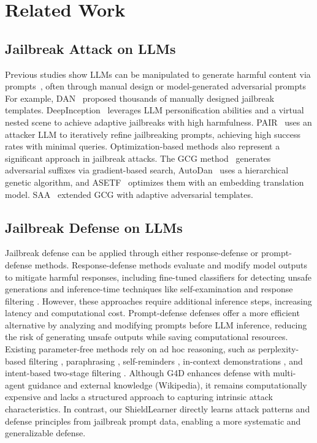 \section{Related Work}
\label{Related Work}
\subsection{Jailbreak Attack on LLMs}
Previous studies show LLMs can be manipulated to generate harmful content via prompts~\citep{wang2024diffusionattacker, wei2024jailbroken}, often through manual design or model-generated adversarial prompts
For example, DAN~\cite{shen2024anything} proposed thousands of manually designed jailbreak templates. DeepInception~\cite{li2023deepinception} leverages LLM personification abilities and a virtual nested scene to achieve adaptive jailbreaks with high harmfulness. PAIR~\cite{chao2023jailbreaking} uses an attacker LLM to iteratively refine jailbreaking prompts, achieving high success rates with minimal queries.
Optimization-based methods also represent a significant approach in jailbreak attacks. 
The GCG method~\cite{zou2023universal} generates adversarial suffixes via gradient-based search, AutoDan~\cite{liu2023autodan} uses a hierarchical genetic algorithm, and ASETF~\cite{wang2024asetf} optimizes them with an embedding translation model.
SAA~\cite{andriushchenko2024jailbreaking} extended GCG with adaptive adversarial templates. 

\subsection{Jailbreak Defense on LLMs}
Jailbreak defense can be applied through either response-defense or prompt-defense methods.
Response-defense methods evaluate and modify model outputs to mitigate harmful responses, including fine-tuned classifiers \cite{ji2024aligner, inan2023llama, zhang2024shieldlm, zeng2024shieldgemma} for detecting unsafe generations and inference-time techniques like self-examination and response filtering \cite{phute2023llm, robey2023smoothllm, xu2024safedecoding, zeng2024autodefense}.
However, these approaches require additional inference steps, increasing latency and computational cost.
Prompt-defense defenses offer a more efficient alternative by analyzing and modifying prompts before LLM inference, reducing the risk of generating unsafe outputs while saving computational resources. 
Existing parameter-free methods rely on ad hoc reasoning, such as perplexity-based filtering \cite{alon2023detecting}, paraphrasing \cite{jain2023baseline}, self-reminders \cite{xie2023defending}, in-context demonstrations \cite{wei2023jailbreak}, and intent-based two-stage filtering \cite{zhang2024intention}. Although G4D \cite{cao2024guide} enhances defense with multi-agent guidance and external knowledge (Wikipedia), it remains computationally expensive and lacks a structured approach to capturing intrinsic attack characteristics. In contrast, our ShieldLearner directly learns attack patterns and defense principles from jailbreak prompt data, enabling a more systematic and generalizable defense.
